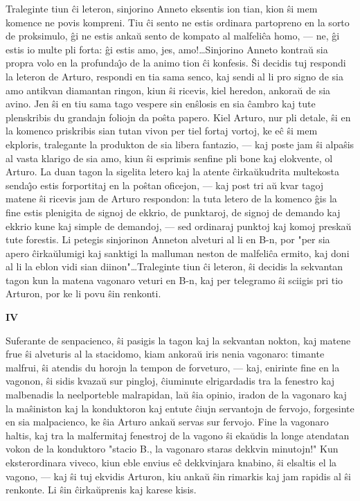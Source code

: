    Traleginte tiun \^ci leteron, sinjorino Anneto eksentis ion tian,
kion \^si mem komence ne povis kompreni. Tiu \^ci sento ne estis
ordinara partopreno en la sorto de proksimulo, \^gi ne estis anka\u
u sento de kompato al malfeli\^ca homo, --- ne, \^gi estis io multe
pli forta: \^gi estis amo, jes, amo!\dots Sinjorino Anneto kontra\u
u sia propra volo en la profunda\^{\j}o de la animo tion \^ci
konfesis. \^Si decidis tuj respondi la leteron de Arturo, respondi
en tia sama senco, kaj sendi al li pro signo de sia amo antikvan
diamantan ringon, kiun \^si ricevis, kiel heredon, ankora\u u de sia
avino. Jen \^si en tiu sama tago vespere sin en\^slosis en sia
\^cambro kaj tute plenskribis du grandajn foliojn da po\^sta papero.
Kiel Arturo, nur pli detale, \^si en la komenco priskribis sian
tutan vivon per tiel fortaj vortoj, ke e\^c \^si mem ekploris,
tralegante la produkton de sia libera fantazio, --- kaj poste jam
\^si alpa\^sis al vasta klarigo de sia amo, kiun \^si esprimis
senfine pli bone kaj elokvente, ol Arturo. La duan tagon la sigelita
letero kaj la atente \^cirka\u ukudrita multekosta senda\^{\j}o
estis forportitaj en la po\^stan oficejon, --- kaj post tri a\u u
kvar tagoj matene \^si ricevis jam de Arturo respondon: la tuta
letero de la komenco \^gis la fine estis plenigita de signoj de
ekkrio, de punktaroj, de signoj de demando kaj ekkrio kune kaj
simple de demandoj, --- sed ordinaraj punktoj kaj komoj preska\u u
tute forestis. Li petegis sinjorinon Anneton alveturi al li en B-n,
por "per sia apero \^cirka\u ulumigi kaj sanktigi la malluman
neston de malfeli\^ca ermito, kaj doni al li la eblon vidi sian
diinon"\dots Traleginte tiun \^ci leteron, \^si decidis la
sekvantan tagon kun la matena vagonaro veturi en B-n, kaj per
telegramo \^si sciigis pri tio Arturon, por ke li povu \^sin
renkonti.

\begin{center}
\textbf{IV}
\end{center}

   Suferante de senpacienco, \^si pasigis la tagon kaj la sekvantan
nokton, kaj matene frue \^si alveturis al la stacidomo, kiam
ankora\u u iris nenia vagonaro: timante malfrui, \^si atendis du
horojn la tempon de forveturo, --- kaj, enirinte fine en la vagonon,
\^si sidis kvaza\u u sur pingloj, \^ciuminute elrigardadis tra la
fenestro kaj malbenadis la neelporteble malrapidan, la\u u \^sia
opinio, iradon de la vagonaro kaj la ma\^siniston kaj la konduktoron
kaj entute \^ciujn servantojn de fervojo, forgesinte en sia
malpacienco, ke \^sia Arturo anka\u u servas sur fervojo. Fine la
vagonaro haltis, kaj tra la malfermitaj fenestroj de la vagono \^si
eka\u udis la longe atendatan vokon de la konduktoro "stacio B., la
vagonaro staras dekkvin minutojn!" Kun eksterordinara viveco, kiun
eble envius e\^c dekkvinjara knabino, \^si elsaltis el la vagono,
--- kaj \^si tuj ekvidis Arturon, kiu anka\u u \^sin rimarkis kaj jam
rapidis al \^si renkonte. Li \^sin \^cirka\u uprenis kaj karese
kisis.

